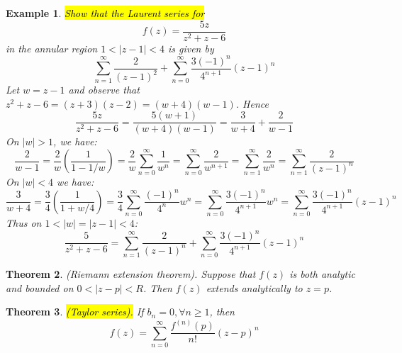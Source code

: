 \documentclass{article}
\newtheorem{theorem}{Theorem}[section]
\newtheorem{example}[theorem]{Example}
\theoremstyle{definition}
\begin{document}
\begin{example} \normalfont
    \hl{Show that the Laurent series for}
    \begin{equation*}
        f(z) = \frac{5z}{z^2+z-6}
    \end{equation*}
    in the annular region $1 < |z-1| < 4$ is given by
    \begin{equation*}
        \sum_{n=1}^\infty \frac{2}{(z-1)^2} + \sum_{n=0}^\infty \frac{3(-1)^n}{4^{n+1}} (z-1)^n
    \end{equation*}
    Let $w=z-1$ and observe that $z^2+z-6 = (z+3)(z-2) = (w+4)(w-1)$. Hence
    \begin{equation*}
        \frac{5z}{z^2+z-6} = \frac{5(w+1)}{(w+4)(w-1)} = \frac{3}{w+4} + \frac{2}{w-1}
    \end{equation*}
    On $|w| > 1$, we have:
    \begin{equation*}
        \frac{2}{w-1} = \frac{2}{w}\left( \frac{1}{1-1/w} \right) = \frac{2}{w} \sum_{n=0}^\infty \frac{1}{w^n} = \sum_{n=0}^\infty \frac{2}{w^{n+1}} = \sum_{n=1}^\infty \frac{2}{w^n} = \sum_{n=1}^\infty \frac{2}{(z-1)^n}
    \end{equation*}
    On $|w|<4$ we have:
    \begin{equation*}
        \frac{3}{w+4} = \frac{3}{4} \left( \frac{1}{1 + w/4} \right) = \frac{3}{4} \sum_{n=0}^\infty \frac{(-1)^n}{4^n} w^n = \sum_{n=0}^\infty \frac{3(-1)^n}{4^{n+1}} w^n = \sum_{n=0}^\infty \frac{3(-1)^n}{4^{n+1}} (z-1)^n
    \end{equation*}
    Thus on $1 < |w| = |z-1| < 4$:
    \begin{equation*}
        \frac{5}{z^2+z-6} = \sum_{n=1}^\infty \frac{2}{(z-1)^n} + \sum_{n=0}^\infty \frac{3(-1)^n}{4^{n+1}} (z-1)^n
    \end{equation*}
\end{example}

\begin{theorem}
    (Riemann extension theorem). Suppose that $f(z)$ is both analytic and bounded on $0 < |z-p| < R$. Then $f(z)$ extends analytically to $z = p$.
\end{theorem}

\begin{theorem}
    \hl{(Taylor series).} If $b_n = 0, \forall n \geq 1$, then
    \begin{equation*}
        f(z) = \sum_{n=0}^\infty \frac{f^{(n)} (p)}{n!} (z-p)^n
    \end{equation*}
\end{theorem}
\end{document}
